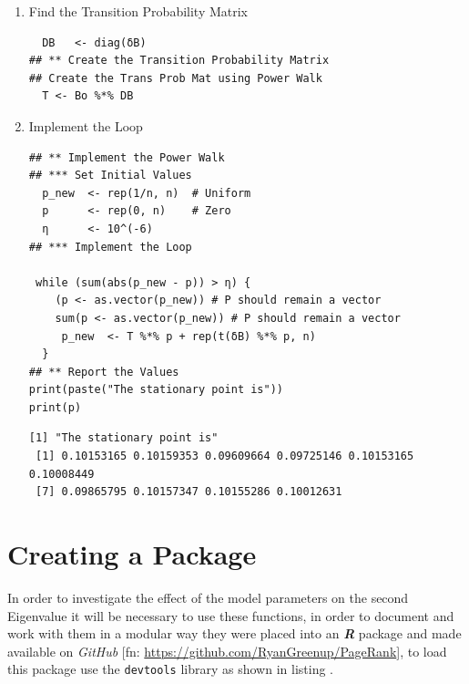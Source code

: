\documentclass[11pt]{article}
\begin{document}
\begin{enumerate}
\begin{verbatim}
(δB   <- 1/(colSums(Bo)+n))
\end{verbatim}

\begin{verbatim}
        1         2         8         5         7         6         9         3
0.1041558 0.1086720 0.1000000 0.1013479 0.1013479 0.1013479 0.1000000 0.1071237
        4        10
0.1056189 0.1000000
\end{verbatim}


\begin{verbatim}
(δB   <- 1/(colSums(B)))
\end{verbatim}

\begin{verbatim}
        1         2         8         5         7         6         9         3
0.1041558 0.1086720 0.1000000 0.1013479 0.1013479 0.1013479 0.1000000 0.1071237
        4        10
0.1056189 0.1000000
\end{verbatim}


\item Find the Transition Probability Matrix
\label{sec:org066ab51}
\begin{verbatim}
  DB   <- diag(δB)
## ** Create the Transition Probability Matrix
## Create the Trans Prob Mat using Power Walk
  T <- Bo %*% DB
\end{verbatim}

\item Implement the Loop
\label{sec:orgbb34a45}
\begin{verbatim}
## ** Implement the Power Walk
## *** Set Initial Values
  p_new  <- rep(1/n, n)  # Uniform
  p      <- rep(0, n)    # Zero
  η      <- 10^(-6)
## *** Implement the Loop

 while (sum(abs(p_new - p)) > η) {
    (p <- as.vector(p_new)) # P should remain a vector
    sum(p <- as.vector(p_new)) # P should remain a vector
     p_new  <- T %*% p + rep(t(δB) %*% p, n)
  }
## ** Report the Values
print(paste("The stationary point is"))
print(p)
\end{verbatim}

\begin{verbatim}
[1] "The stationary point is"
 [1] 0.10153165 0.10159353 0.09609664 0.09725146 0.10153165 0.10008449
 [7] 0.09865795 0.10157347 0.10155286 0.10012631
\end{verbatim}
\end{enumerate}

\section{Creating a Package}
\label{create-package}
In order to investigate the effect of the model parameters on the second
Eigenvalue it will be necessary to use these functions, in order to document and
work with them in a modular way they were placed into an \textbf{\emph{R}} package and made
available on \emph{GitHub} [fn: \url{https://github.com/RyanGreenup/PageRank}], to load this package use the \texttt{devtools} library as shown in listing .
\end{document}
